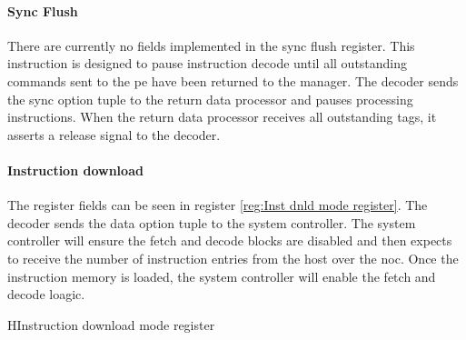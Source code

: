 \paragraph{Sync Flush}

There are currently no fields implemented in the sync flush register.
This instruction is designed to pause instruction decode until all outstanding commands sent to the \ac{pe} have been returned to the manager.
The decoder sends the sync option tuple to the return data processor and pauses processing instructions.
When the return data processor receives all outstanding tags, it asserts a release signal to the decoder.


\paragraph{Instruction download}

The register fields can be seen in register \ref{reg:Inst dnld mode register}.
The decoder sends the data option tuple to the system controller.
The system controller will ensure the fetch and decode blocks are disabled and then expects to receive the number of instruction entries from the host over the \ac{noc}.
Once the instruction memory is loaded, the system controller will enable the fetch and decode loagic.
\begin{register}{H}{Instruction download mode register}{}%
  \label{reg:Inst dnld mode register}
  \vspace{-10pt}
\end{register}


